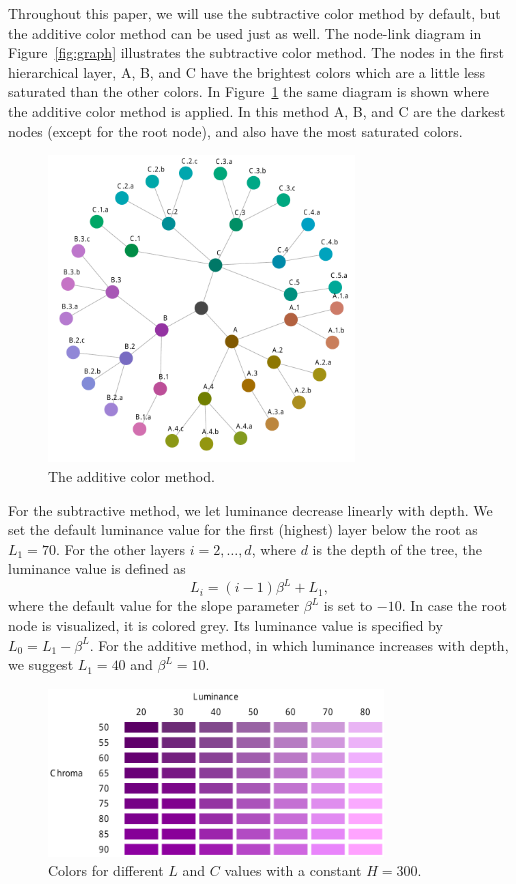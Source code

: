 \documentclass[review,journal]{vgtc}         %
\begin{document}
Throughout this paper, we will use the subtractive color method by default, but the additive color method can be used just as well. The node-link diagram in Figure~\ref{fig:graph} illustrates the subtractive color method. The nodes in the first hierarchical layer, A, B, and C have the brightest colors which are a little less saturated than the other colors. In Figure~\ref{fig:graphadd} the same diagram is shown where the additive color method is applied. In this method A, B, and C are the darkest nodes (except for the root node), and also have the most saturated colors.

\begin{figure}[tb]
  \centering
  \includegraphics[width=3.2in]{HCPgraph3.pdf}
  \caption{The additive color method.}\label{fig:graphadd}
\end{figure}


For the subtractive method, we let luminance decrease linearly with depth. We set the default luminance value for the first (highest) layer below the root as $L_1=70$. For the other layers $i=2,\ldots, d$, where $d$ is the depth of the tree, the luminance value is defined as
\begin{equation}
L_i=(i-1)\beta^L + L_1,
\end{equation}
where the default value for the slope parameter $\beta^L$ is set to $-10$. In case the root node is visualized, it is colored grey. Its luminance value is specified by $L_0=L_1-\beta^L$. For the additive method, in which luminance increases with depth, we suggest $L_1=40$ and $\beta^L=10$. 

\begin{figure}[tb]
  \centering
  \includegraphics[width=3.5in]{LC.pdf}
  \caption{Colors for different $L$ and $C$ values with a constant $H=300$.}\label{fig:lc}
\end{figure}
\end{document}
